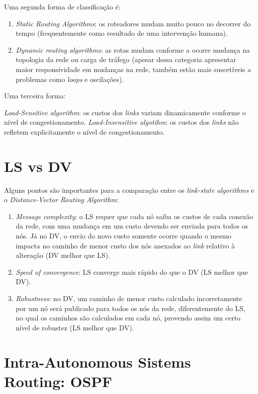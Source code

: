 Uma segunda forma de classificação é:

\begin{enumerate}
\def\labelenumi{\arabic{enumi}.}
\tightlist
\item
  \emph{Static Routing Algorithms}: os roteadores mudam muito pouco no
  decorrer do tempo (frequentemente como resultado de uma intervenção
  humana).
\item
  \emph{Dynamic routing algorithms}: as rotas mudam conforme a ocorre
  mudança na topologia da rede ou carga de tráfego (apesar dessa
  categoria apresentar maior responsividade em mudanças na rede, também
  estão mais suscetíveis a problemas como \emph{loops} e oscilações).
\end{enumerate}

Uma terceira forma:

\emph{Load-Sensitive algorithm}: os custos dos \emph{links} variam
dinamicamente conforme o nível de congestionamento.
\emph{Load-Insensitive algotihm}: os custos dos \emph{links} não
refletem explicitamente o nível de congestionamento.

\hypertarget{ls-vs-dv}{%
\section{LS vs DV}\label{ls-vs-dv}}

Alguns pontos são importantes para a comparação entre os
\emph{link-state algorithms} e o \emph{Distance-Vector Routing
Algorithm}:

\begin{enumerate}
\def\labelenumi{\arabic{enumi}.}
\item
  \emph{Message complexity}: o LS requer que cada nó saiba os custos de
  cada conexão da rede, com uma mudança em um custo devendo ser enviada
  para todos os nós. Já no DV, o envio do novo custo somente ocorre
  quando o mesmo impacta no caminho de menor custo dos nós anexados ao
  \emph{link} relativo à alteração (DV melhor que LS).
\item
  \emph{Speed of convergence}: LS converge mais rápido do que o DV (LS
  melhor que DV).
\item
  \emph{Robustness}: no DV, um caminho de menor custo calculado
  incorretamente por um nó será publicado para todos os nós da rede,
  diferentemente do LS, no qual os caminhos são calculados em cada nó,
  provendo assim um certo nível de robustez (LS melhor que DV).
\end{enumerate}

\hypertarget{intra-autonomous-sistems-routing-ospf}{%
\section{Intra-Autonomous Sistems Routing: OSPF}\label{intra-autonomous-sistems-routing-ospf}}

